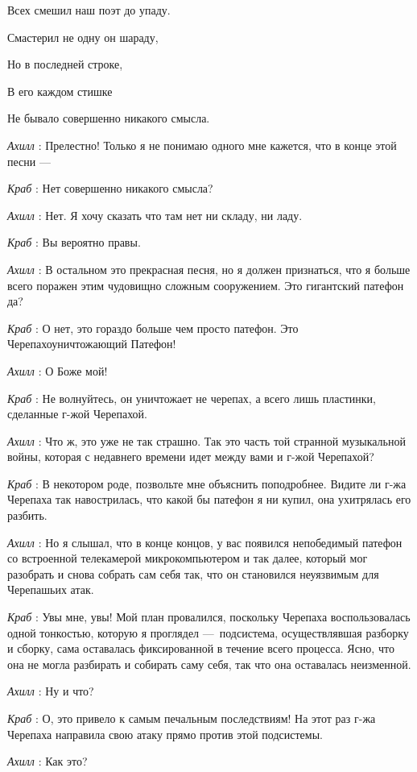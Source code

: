 \documentclass[../main.tex]{subfiles}
\begin{document}
\begin{dialogue}
Всех смешил наш поэт до упаду.

Смастерил не одну он шараду,

Но в последней строке,

В его каждом стишке

Не бывало совершенно никакого смысла.

\emph{Ахилл} : Прелестно! Только я не понимаю одного мне кажется, что в конце этой песни ---

\emph{Краб} : Нет совершенно никакого смысла?

\emph{Ахилл} : Нет. Я хочу сказать что там нет ни складу, ни ладу.

\emph{Краб} : Вы вероятно правы.

\emph{Ахилл} : В остальном это прекрасная песня, но я должен признаться, что я больше всего поражен этим чудовищно сложным сооружением. Это гигантский патефон да?

\emph{Краб} : О нет, это гораздо больше чем просто патефон. Это Черепахоуничтожающий Патефон!

\emph{Ахилл} : О Боже мой!

\emph{Краб} : Не волнуйтесь, он уничтожает не черепах, а всего лишь пластинки, сделанные г-жой Черепахой.

\emph{Ахилл} : Что ж, это уже не так страшно. Так это часть той странной музыкальной войны, которая с недавнего времени идет между вами и г-жой Черепахой?

\emph{Краб} : В некотором роде, позвольте мне объяснить поподробнее. Видите ли г-жа Черепаха так навострилась, что какой бы патефон я ни купил, она ухитрялась его разбить.

\emph{Ахилл} : Но я слышал, что в конце концов, у вас появился непобедимый патефон со встроенной телекамерой микрокомпьютером и так далее, который мог разобрать и снова собрать сам себя так, что он становился неуязвимым для Черепашьих атак.

\emph{Краб} : Увы мне, увы! Мой план провалился, поскольку Черепаха воспользовалась одной тонкостью, которую я проглядел ---~подсистема, осуществлявшая разборку и сборку, сама оставалась фиксированной в течение всего процесса. Ясно, что она не могла разбирать и собирать саму себя, так что она оставалась неизменной.

\emph{Ахилл} : Ну и что?

\emph{Краб} : О, это привело к самым печальным последствиям! На этот раз г-жа Черепаха направила свою атаку прямо против этой подсистемы.

\emph{Ахилл} : Как это?


\end{dialogue}
\end{document}

